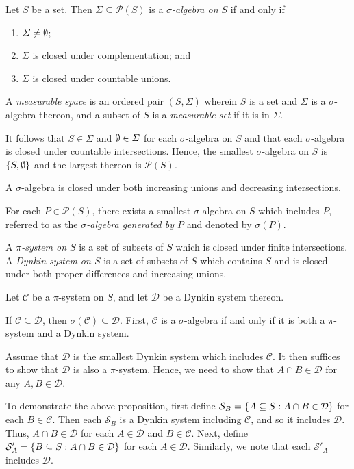 \Bdf
  Let \(S\) be a set. Then \(\varSigma \subseteq \mathcal{P}(S)\) is a \emph{\(\sigma\)-algebra on \(S\)} if and only if
  \begin{enumerate}
    \item \(\varSigma \ne \emptyset\);
    \item \(\varSigma\) is closed under complementation; and
    \item \(\varSigma\) is closed under countable unions.
  \end{enumerate}

  A \emph{measurable space} is an ordered pair \((S, \varSigma)\) wherein \(S\) is a set and \(\varSigma\) is a
  \(\sigma\)-algebra thereon, and a subset of \(S\) is a \emph{measurable set} if it is in \(\varSigma\).
\Edf

It follows that \(S \in \varSigma\) and \(\emptyset \in \varSigma\) for each \(\sigma\)-algebra on \(S\) and that each
\(\sigma\)-algebra is closed under countable intersections. Hence, the smallest \(\sigma\)-algebra on \(S\) is \(\{S,
\emptyset\}\) and the largest thereon is \(\mathcal{P}(S)\).

A \(\sigma\)-algebra is closed under both increasing unions and decreasing intersections.

For each \(P \in \mathcal{P}(S)\), there exists a smallest \(\sigma\)-algebra on \(S\) which includes \(P\), referred to
as the \emph{\(\sigma\)-algebra generated by \(P\)} and denoted by \(\sigma(P)\).

A \emph{\(\pi\)-system on \(S\)} is a set of subsets of \(S\) which is closed under finite intersections. A
\emph{Dynkin system on \(S\)} is a set of subsets of \(S\) which contains \(S\) and is closed under both proper
differences and increasing unions.

  Let \(\mathcal{C}\) be a \(\pi\)-system on \(S\), and let \(\mathcal{D}\) be a Dynkin system thereon.

  If \(\mathcal{C} \subseteq \mathcal{D}\), then \(\sigma(\mathcal{C}) \subseteq \mathcal{D}\).
\Eth
\Bpr
  First, \(\mathcal{C}\) is a \(\sigma\)-algebra if and only if it is both a \(\pi\)-system and a Dynkin system.

  Assume that \(\mathcal{D}\) is the smallest Dynkin system which includes \(\mathcal{C}\). It then suffices to show
  that \(\mathcal{D}\) is also a \(\pi\)-system. Hence, we need to show that \(A \cap B \in \mathcal{D}\) for any
  \(A, B \in \mathcal{D}\).

  To demonstrate the above proposition, first define \(\mathcal{S}_B = \{A \subseteq S : A \cap B \in \mathcal{D}\}\)
  for each \(B \in \mathcal{C}\). Then each \(\mathcal{S}_B\) is a Dynkin system including \(\mathcal{C}\), and so it
  includes \(\mathcal{D}\). Thus, \(A \cap B \in \mathcal{D}\) for each \(A \in \mathcal{D}\) and \(B \in \mathcal{C}\).
  Next, define \(\mathcal{S}'_A = \{B \subseteq S : A \cap B \in \mathcal{D}\}\) for each \(A \in \mathcal{D}\).
  Similarly, we note that each \(\mathcal{S}'_A\) includes \(\mathcal{D}\).

